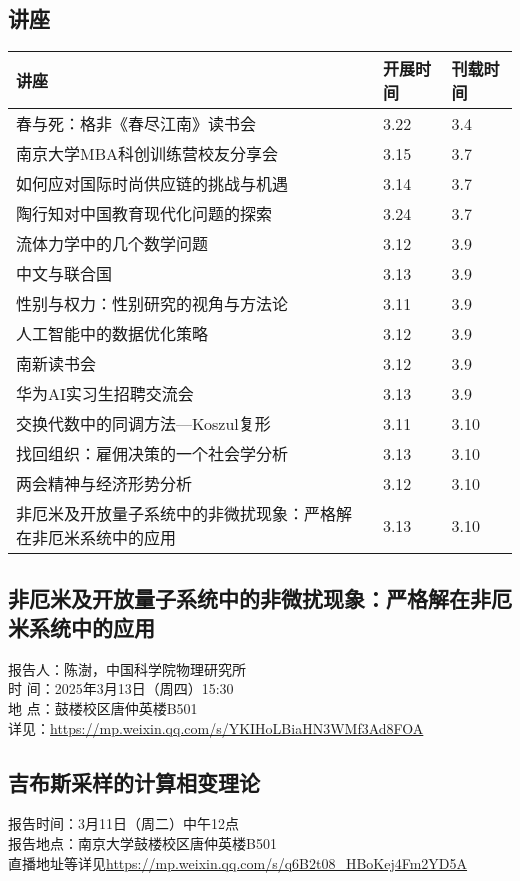 \documentclass[letterpaper, 12pt]{article}
\begin{document}
\begin{multicols}{2}
\section{讲座}
\begin{tabular}{|>{\centering\arraybackslash}m{}|m{}|m{}|}
    \hline
    讲座 & 开展时间 & 刊载时间\\
    \hline\hline
    春与死：格非《春尽江南》读书会 & 3.22 & 3.4\\\hline
    南京大学MBA科创训练营校友分享会 & 3.15 & 3.7\\\hline
    如何应对国际时尚供应链的挑战与机遇 & 3.14 & 3.7\\\hline
    陶行知对中国教育现代化问题的探索 & 3.24 & 3.7\\\hline
    流体力学中的几个数学问题 & 3.12 & 3.9\\\hline
    中文与联合国 & 3.13 & 3.9\\\hline
    性别与权力：性别研究的视角与方法论 & 3.11 & 3.9\\\hline
    人工智能中的数据优化策略 & 3.12 & 3.9\\\hline
    南新读书会 & 3.12 & 3.9\\\hline
    华为AI实习生招聘交流会 & 3.13 & 3.9\\\hline
    交换代数中的同调方法—Koszul复形 & 3.11 & 3.10\\\hline
    找回组织：雇佣决策的一个社会学分析 & 3.13 & 3.10\\\hline
    两会精神与经济形势分析 & 3.12 & 3.10\\\hline
    非厄米及开放量子系统中的非微扰现象：严格解在非厄米系统中的应用 & 3.13 & 3.10\\\hline
\end{tabular}
\subsection{非厄米及开放量子系统中的非微扰现象：严格解在非厄米系统中的应用}
报告人：陈澍，中国科学院物理研究所\\
时   间：2025年3月13日（周四）15:30\\
地   点：鼓楼校区唐仲英楼B501\\
详见：\url{https://mp.weixin.qq.com/s/YKIHoLBiaHN3WMf3Ad8FOA}
\subsection{吉布斯采样的计算相变理论}
报告时间：3月11日（周二）中午12点\\
报告地点：南京大学鼓楼校区唐仲英楼B501\\
直播地址等详见\url{https://mp.weixin.qq.com/s/q6B2t08_HBoKej4Fm2YD5A}

\end{multicols}
\end{document}
